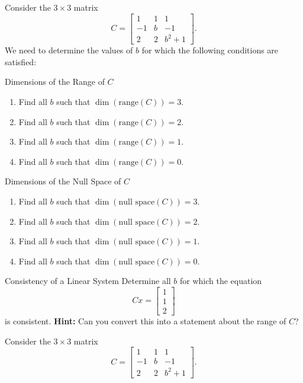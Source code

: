 \documentclass{report}
\begin{document}
Consider the $3 \times 3$ matrix
\[
C=\begin{bmatrix} 
1 & 1 & 1 \\ 
-1 & b  &  -1 \\ 
2 & 2 & b^2+1 
\end{bmatrix}.
\]
We need to determine the values of $b$ for which the following conditions are satisfied:

Dimensions of the Range of $C$
\begin{enumerate}
    \item Find all $b$ such that $\dim(\text{range}(C))=3$.
    \item Find all $b$ such that $\dim(\text{range}(C))=2$.
    \item Find all $b$ such that $\dim(\text{range}(C))=1$.
    \item Find all $b$ such that $\dim(\text{range}(C))=0$.
\end{enumerate}

Dimensions of the Null Space of $C$
\begin{enumerate}
    \item Find all $b$ such that $\dim(\text{null space}(C))=3$.
    \item Find all $b$ such that $\dim(\text{null space}(C))=2$.
    \item Find all $b$ such that $\dim(\text{null space}(C))=1$.
    \item Find all $b$ such that $\dim(\text{null space}(C))=0$.
\end{enumerate}

Consistency of a Linear System
Determine all $b$ for which the equation
\begin{equation}
Cx=\begin{bmatrix} 1 \\ 1 \\2 \end{bmatrix}
\end{equation}
is consistent. \textbf{Hint:} Can you convert this into a statement about the range of $C$?\\


\sol

Consider the $3 \times 3$ matrix
\[
C=\begin{bmatrix} 
1 & 1 & 1 \\ 
-1 & b  &  -1 \\ 
2 & 2 & b^2+1 
\end{bmatrix}.
\]
\end{document}
